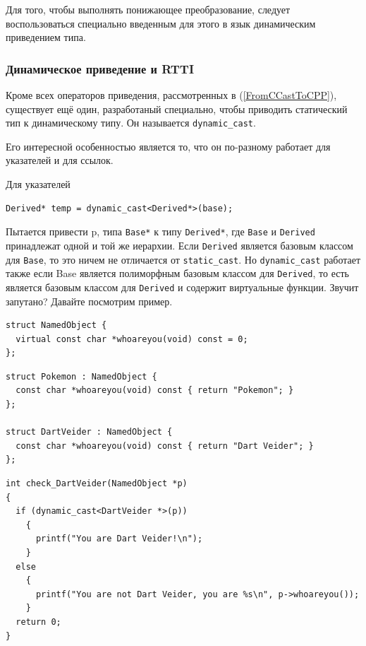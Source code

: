 \documentclass[a4paper,12pt,oneside]{article}
\begin{document}
Для того, чтобы выполнять понижающее преобразование, следует воспользоваться специально введенным для этого в язык динамическим приведением типа.

\subsubsection{Динамическое приведение и RTTI}\label{DynCastRTTI}

Кроме всех операторов приведения, рассмотренных в (\ref{FromCCastToCPP}), существует ещё один, разработаный специально, чтобы приводить статический тип к динамическому типу. Он называется \lstinline!dynamic_cast!. 

Его интересной особенностью является то, что он по-разному работает для указателей и для ссылок. 

Для указателей

\begin{lstlisting}
Derived* temp = dynamic_cast<Derived*>(base);
\end{lstlisting}

Пытается привести p, типа \lstinline!Base*! к типу \lstinline!Derived*!, где \lstinline!Base! и \lstinline!Derived! принадлежат одной и той же иерархии. Если \lstinline!Derived! является базовым классом для \lstinline!Base!, то это ничем не отличается от \lstinline!static_cast!. Но \lstinline!dynamic_cast! работает также если Base является полиморфным базовым классом для \lstinline!Derived!, то есть является базовым классом для \lstinline!Derived! и содержит виртуальные функции. Звучит запутано? Давайте посмотрим пример.

\begin{lstlisting}
struct NamedObject {
  virtual const char *whoareyou(void) const = 0;
};
\end{lstlisting}

\begin{lstlisting}
struct Pokemon : NamedObject {
  const char *whoareyou(void) const { return "Pokemon"; }
};

struct DartVeider : NamedObject {
  const char *whoareyou(void) const { return "Dart Veider"; }
};
\end{lstlisting}

\begin{lstlisting}
int check_DartVeider(NamedObject *p)
{
  if (dynamic_cast<DartVeider *>(p))
    {
      printf("You are Dart Veider!\n");
    }
  else
    {
      printf("You are not Dart Veider, you are %s\n", p->whoareyou());
    }
  return 0;
}
\end{lstlisting}
\end{document}
